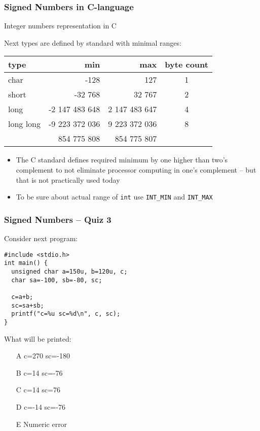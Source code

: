 \documentclass{beamer}
\begin{document}
\begin{frame}
\frametitle{Signed Numbers in C-language}
Integer numbers representation in C

Next types are defined by standard with minimal ranges:
\begin{tabular}{|l|r|r|c|}\hline
type & min & max & byte count\\ \hline
char & -128 & 127 & 1 \\ \hline
short & -32 768 & 32 767 & 2 \\ \hline 
long & -2 147 483 648 & 2 147 483 647 & 4 \\ \hline
long long & -9 223 372 036 & 9 223 372 036  & 8 \\ 
 & \phantom{xx} 854 775 808 & \phantom{xx}854 775 807 &  \\ \hline
\end{tabular}

\begin{itemize}
\item The C standard defines required minimum by one higher than two's complement to not eliminate processor computing in one's complement -- but that is not practically used today
\item To be sure about actual range of \texttt{int} use \texttt{INT\_MIN} and \texttt{INT\_MAX}
\end{itemize}

\end{frame}


\begin{frame}[fragile, shrink=5]
\frametitle{Signed Numbers -- Quiz 3}

Consider next program:
\begin{verbatim}
#include <stdio.h>
int main() {
  unsigned char a=150u, b=120u, c;
  char sa=-100, sb=-80, sc;
  
  c=a+b;
  sc=sa+sb;
  printf("c=%u sc=%d\n", c, sc);
}
\end{verbatim}

What will be printed:
\begin{itemize}
\item[A] c=270 sc=-180
\item[B] c=14 sc=-76
\item[C] c=14 sc=76
\item[D] c=-14 sc=-76
\item[E] Numeric error
\end{itemize}
\end{frame}
\end{document}
